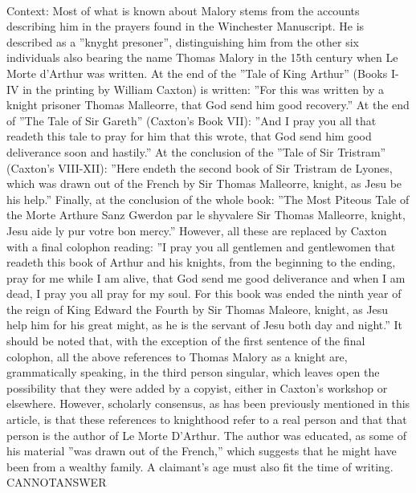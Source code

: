 \documentclass[11pt,a4paper, onecolumn]{article}
\begin{document}
\\ Context: Most of what is known about Malory stems from the accounts describing him in the prayers found in the Winchester Manuscript. He is described as a ''knyght presoner'', distinguishing him from the other six individuals also bearing the name Thomas Malory in the 15th century when Le Morte d'Arthur was written. At the end of the ''Tale of King Arthur'' (Books I-IV in the printing by William Caxton) is written: ''For this was written by a knight prisoner Thomas Malleorre, that God send him good recovery.'' At the end of ''The Tale of Sir Gareth'' (Caxton's Book VII): ''And I pray you all that readeth this tale to pray for him that this wrote, that God send him good deliverance soon and hastily.'' At the conclusion of the ''Tale of Sir Tristram'' (Caxton's VIII-XII): ''Here endeth the second book of Sir Tristram de Lyones, which was drawn out of the French by Sir Thomas Malleorre, knight, as Jesu be his help.'' Finally, at the conclusion of the whole book: ''The Most Piteous Tale of the Morte Arthure Sanz Gwerdon par le shyvalere Sir Thomas Malleorre, knight, Jesu aide ly pur votre bon mercy.'' However, all these are replaced by Caxton with a final colophon reading: ''I pray you all gentlemen and gentlewomen that readeth this book of Arthur and his knights, from the beginning to the ending, pray for me while I am alive, that God send me good deliverance and when I am dead, I pray you all pray for my soul. For this book was ended the ninth year of the reign of King Edward the Fourth by Sir Thomas Maleore, knight, as Jesu help him for his great might, as he is the servant of Jesu both day and night.'' It should be noted that, with the exception of the first sentence of the final colophon, all the above references to Thomas Malory as a knight are, grammatically speaking, in the third person singular, which leaves open the possibility that they were added by a copyist, either in Caxton's workshop or elsewhere. However, scholarly consensus, as has been previously mentioned in this article, is that these references to knighthood refer to a real person and that that person is the author of Le Morte D'Arthur. The author was educated, as some of his material ''was drawn out of the French,'' which suggests that he might have been from a wealthy family. A claimant's age must also fit the time of writing. CANNOTANSWER
\end{document}
